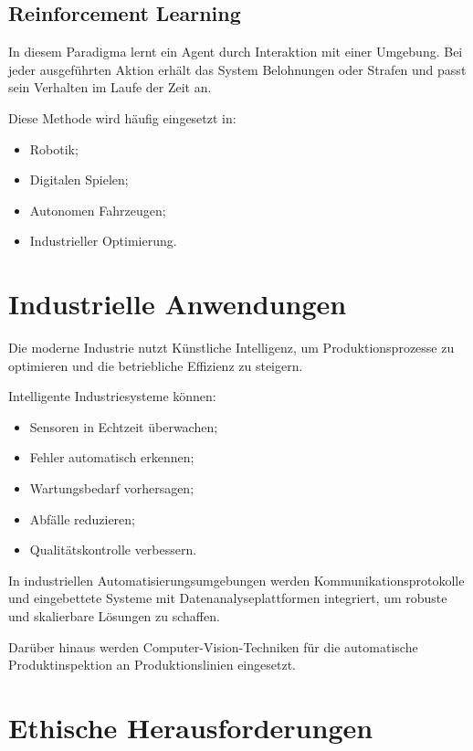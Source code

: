 \documentclass[11pt]{article}
\begin{document}
\subsection{Reinforcement Learning}

In diesem Paradigma lernt ein Agent durch Interaktion mit einer Umgebung. Bei jeder ausgeführten
Aktion erhält das System Belohnungen oder Strafen und passt sein Verhalten im Laufe der
Zeit an.

Diese Methode wird häufig eingesetzt in:

\begin{itemize}
    \item Robotik;
    \item Digitalen Spielen;
    \item Autonomen Fahrzeugen;
    \item Industrieller Optimierung.
\end{itemize} 

\section{Industrielle Anwendungen}

Die moderne Industrie nutzt Künstliche Intelligenz, um Produktionsprozesse zu optimieren und die
betriebliche Effizienz zu steigern.

Intelligente Industriesysteme können:

\begin{itemize}
    \item Sensoren in Echtzeit überwachen;
    \item Fehler automatisch erkennen;
    \item Wartungsbedarf vorhersagen;
    \item Abfälle reduzieren;
    \item Qualitätskontrolle verbessern.
\end{itemize}

In industriellen Automatisierungsumgebungen werden Kommunikationsprotokolle und eingebettete Systeme
mit Datenanalyseplattformen integriert, um robuste und skalierbare Lösungen zu schaffen.
 
Darüber hinaus werden Computer-Vision-Techniken für die automatische Produktinspektion
an Produktionslinien eingesetzt.

\section{Ethische Herausforderungen}
\end{document}
